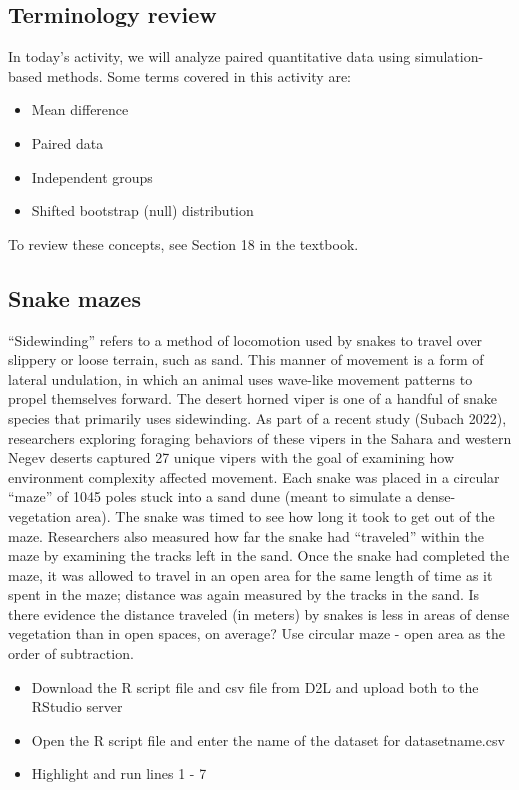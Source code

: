 \documentclass[
]{report}
\begin{document}
\subsection{Terminology review}\label{terminology-review-19}

In today's activity, we will analyze paired quantitative data using simulation-based methods. Some terms covered in this activity are:

\begin{itemize}
\item
  Mean difference
\item
  Paired data
\item
  Independent groups
\item
  Shifted bootstrap (null) distribution
\end{itemize}

To review these concepts, see Section 18 in the textbook.

\subsection{Snake mazes}\label{snake-mazes}

``Sidewinding'' refers to a method of locomotion used by snakes to travel over slippery or loose terrain, such as sand. This manner of movement is a form of lateral undulation, in which an animal uses wave-like movement patterns to propel themselves forward. The desert horned viper is one of a handful of snake species that primarily uses sidewinding. As part of a recent study (Subach 2022), researchers exploring foraging behaviors of these vipers in the Sahara and western Negev deserts captured 27 unique vipers with the goal of examining how environment complexity affected movement. Each snake was placed in a circular ``maze'' of 1045 poles stuck into a sand dune (meant to simulate a dense-vegetation area). The snake was timed to see how long it took to get out of the maze. Researchers also measured how far the snake had ``traveled'' within the maze by examining the tracks left in the sand. Once the snake had completed the maze, it was allowed to travel in an open area for the same length of time as it spent in the maze; distance was again measured by the tracks in the sand. Is there evidence the distance traveled (in meters) by snakes is less in areas of dense vegetation than in open spaces, on average? Use circular maze - open area as the order of subtraction.

\begin{itemize}
\item
  Download the R script file and csv file from D2L and upload both to the RStudio server
\item
  Open the R script file and enter the name of the dataset for datasetname.csv
\item
  Highlight and run lines 1 - 7
\end{itemize}
\end{document}
